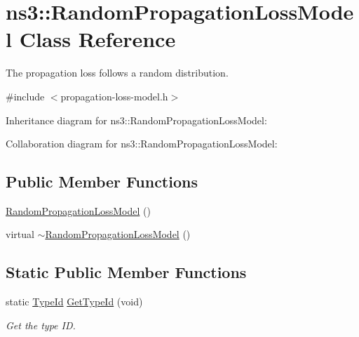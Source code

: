 \hypertarget{classns3_1_1RandomPropagationLossModel}{}\section{ns3\+:\+:Random\+Propagation\+Loss\+Model Class Reference}
\label{classns3_1_1RandomPropagationLossModel}


The propagation loss follows a random distribution.  




{\ttfamily \#include $<$propagation-\/loss-\/model.\+h$>$}



Inheritance diagram for ns3\+:\+:Random\+Propagation\+Loss\+Model\+:


Collaboration diagram for ns3\+:\+:Random\+Propagation\+Loss\+Model\+:
\subsection*{Public Member Functions}
\begin{DoxyCompactItemize}
\item 
\hyperlink{classns3_1_1RandomPropagationLossModel_a316c1d2c2915623810a0b55a08ea5783}{Random\+Propagation\+Loss\+Model} ()
\item 
virtual \hyperlink{classns3_1_1RandomPropagationLossModel_aece2b10fd31256d2177994c75d4e3bdb}{$\sim$\+Random\+Propagation\+Loss\+Model} ()
\end{DoxyCompactItemize}
\subsection*{Static Public Member Functions}
\begin{DoxyCompactItemize}
\item 
static \hyperlink{classns3_1_1TypeId}{Type\+Id} \hyperlink{classns3_1_1RandomPropagationLossModel_a40360065f51b550deedc8692fb6bc29a}{Get\+Type\+Id} (void)
\begin{DoxyCompactList}\small\item\em Get the type ID. \end{DoxyCompactList}\end{DoxyCompactItemize}
